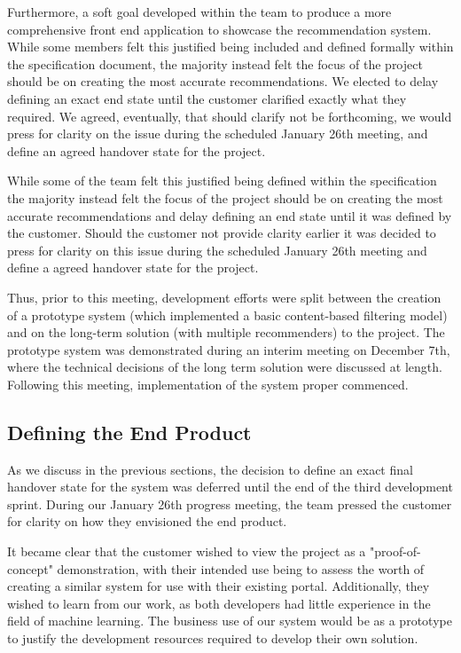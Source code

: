 \documentclass{l3proj}
\begin{document}
Furthermore, a soft goal developed within the team to produce a more comprehensive front end application to showcase the recommendation system. While some members felt this justified being included and defined formally within the specification document, the majority instead felt the focus of the project should be on creating the most accurate recommendations. We elected to delay defining an exact end state until the customer clarified exactly what they required. We agreed, eventually, that should clarify not be forthcoming, we would press for clarity on the issue during the scheduled January 26th meeting, and define an agreed handover state for the project. 

While some of the team felt this justified being defined within the specification the majority instead felt the focus of the project should be on creating the most accurate recommendations and delay defining an end state until it was defined by the customer. Should the customer not provide clarity earlier it was decided to press for clarity on this issue during the scheduled January 26th meeting and define a agreed handover state for the project. 

Thus, prior to this meeting, development efforts were split between the creation of a prototype system (which implemented a basic content-based filtering model) and on the long-term solution (with multiple recommenders) to the project. The prototype system was demonstrated during an interim meeting on December 7th, where the technical decisions of the long term solution were discussed at length. Following this meeting, implementation of the system proper commenced. 

\subsection{Defining the End Product}
\label{sec:jandefinedstate}

As we discuss in the previous sections, the decision to define an exact final handover state for the system was deferred until the end of the third development sprint. During our January 26th progress meeting, the team pressed the customer for clarity on how they envisioned the end product. 

It became clear that the customer wished to view the project as a "proof-of-concept" demonstration, with their intended use being to assess the worth of creating a similar system for use with their existing portal. Additionally, they wished to learn from our work, as both developers had little experience in the field of machine learning. The business use of our system would be as a prototype to justify the development resources required to develop their own solution.
\end{document}
